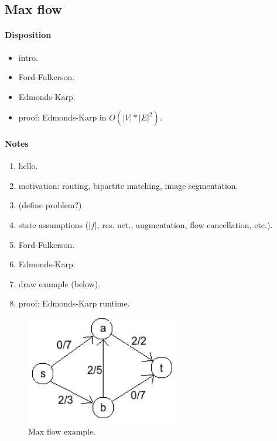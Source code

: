 \subsection{Max flow}

\paragraph{Disposition}
\begin{itemize}
\item intro.
\item Ford-Fulkerson.
\item Edmonds-Karp.
\item proof: Edmonds-Karp in $O(|V| * |E|^2)$.
\end{itemize}

\paragraph{Notes}

\begin{enumerate}
  \item hello.
  \item motivation: routing, bipartite matching, image segmentation.
  \item (define problem?)
  \item state assumptions ($|f|$, res. net., augmentation, flow cancellation,
    etc.).\\

  \item Ford-Fulkerson.
  \item Edmonds-Karp.
  \item draw example (below).
  \item proof: Edmonds-Karp runtime.
\end{enumerate}

\begin{figure}[H]
  \centering
  \includegraphics[width=0.6\textwidth]{figures/max_flow_example.png}
  \caption{Max flow example.}
  \label{fig:max_flow_example}
\end{figure}
